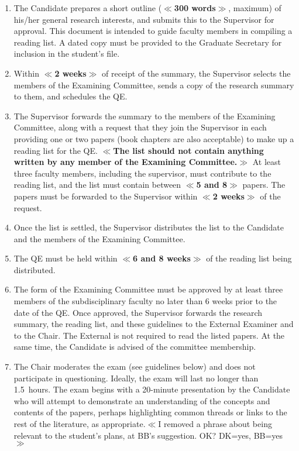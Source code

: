 \documentclass[12pt]{article}
\newcommand\qe{QE\xspace}
\newcommand{\vote}[1]{\color{voteColor}$\ll$#1$\gg$\color{black}\marginpar[$\gg$ vote]{$\ll$ vote}\index{$>>>>$VOTE$<<<<$}}
\newcommand{\mutable}[1]{\textbf{$\ll$#1$\gg$}\marginpar[$\gg$]{$\ll$}}
\newcommand{\supervisor}{Supervisor\xspace}
\newcommand{\GS}{Graduate Secretary\xspace}
\begin{document}
\begin{enumerate}

    \item The Candidate prepares a short outline (\mutable{300 words}, maximum)
        of his/her general research interests, and submits this to the
        \supervisor for approval. This document is intended to guide faculty
        members in compiling a reading list. A dated copy must be provided to
        the \GS for inclusion in the student's file.

    \item Within \mutable{2 weeks} of receipt of the summary, the \supervisor
        selects the members of the Examining Committee, sends a copy of the
        research summary to them, and schedules the \qe.
        
    \item The Supervisor forwards the summary to the members of the Examining
        Committee, along with a request that they join the Supervisor in each
        providing one or two papers (book chapters are also acceptable) to make
        up a reading list for the \qe.  \mutable{The list should not contain
        anything written by any member of the Examining Committee.} At least
        three faculty members, including the supervisor, must contribute to the
        reading list, and the list must contain between \mutable{5 and 8}
        papers.  The papers must be forwarded to the Supervisor within
        \mutable{2 weeks} of the request.

    \item Once the list is settled, the \supervisor distributes the list to the
        Candidate and the members of the Examining Committee.
            
    \item The \qe must be held within \mutable{6 and 8 weeks} of the reading
        list being distributed.

    \item The form of the Examining Committee must be approved by at least
        three members of the subdisciplinary faculty no later than 6 weeks
        prior to the date of the \qe. Once approved, the \supervisor forwards
        the research summary, the reading list, and these guidelines to the
        External Examiner and to the Chair.  The External is not required to
        read the listed papers. At the same time, the Candidate is advised of
        the committee membership. 

    \item The Chair moderates the exam (see guidelines below) and does not
        participate in questioning. Ideally, the exam will last no longer than
        1.5~hours. The exam begins with a 20-minute presentation by the
        Candidate who will attempt to demonstrate an understanding of the
        concepts and contents of the papers, perhaps highlighting common
        threads or links to the rest of the literature, as appropriate.\vote{I
        removed a phrase about being relevant to the student's plans, at BB's
        suggestion. OK? DK=yes, BB=yes}


\end{enumerate}
\end{document}
